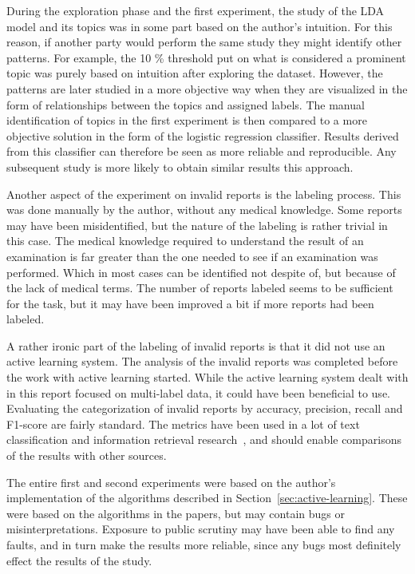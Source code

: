 During the exploration phase and the first experiment, the study of the LDA model and its topics was in some part based on the author's intuition.
For this reason, if another party would perform the same study they might identify other patterns.
For example, the 10 \% threshold put on what is considered a prominent topic was purely based on intuition after exploring the dataset.
However, the patterns are later studied in a more objective way when they are visualized in the form of relationships between the topics and assigned labels.
The manual identification of topics in the first experiment is then compared to a more objective solution in the form of the logistic regression classifier.
Results derived from this classifier can therefore be seen as more reliable and reproducible.
Any subsequent study is more likely to obtain similar results this approach.

Another aspect of the experiment on invalid reports is the labeling process.
This was done manually by the author, without any medical knowledge.
Some reports may have been misidentified, but the nature of the labeling is rather trivial in this case.
The medical knowledge required to understand the result of an examination is far greater than the one needed to see if an examination was performed.
Which in most cases can be identified not despite of, but because of the lack of medical terms.
The number of reports labeled seems to be sufficient for the task, but it may have been improved a bit if more reports had been labeled.

A rather ironic part of the labeling of invalid reports is that it did not use an active learning system.
The analysis of the invalid reports was completed before the work with active learning started.
While the active learning system dealt with in this report focused on multi-label data, it could have been beneficial to use.
Evaluating the categorization of invalid reports by accuracy, precision, recall and F1-score are fairly standard.
The metrics have been used in a lot of text classification and information retrieval research~\cite{aggarwal2012surveyclass, bishop2006pattern}, and should enable comparisons of the results with other sources.

The entire first and second experiments were based on the author's implementation of the algorithms described in Section~\ref{sec:active-learning}.
These were based on the algorithms in the papers, but may contain bugs or misinterpretations.
Exposure to public scrutiny may have been able to find any faults, and in turn make the results more reliable, since any bugs most definitely effect the results of the study.

